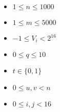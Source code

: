 \begin{itemize}
\tightlist
\item $1 \le n \le 1000$
\item $1 \le m \le 5000$
\item $-1 \le V_i < 2^{16}$
\item $0 \le q \le 10$
\item $t \in \{0, 1\}$
\item $0 \le u, v < n$
\item $0 \le i, j < 16$
\end{itemize}
